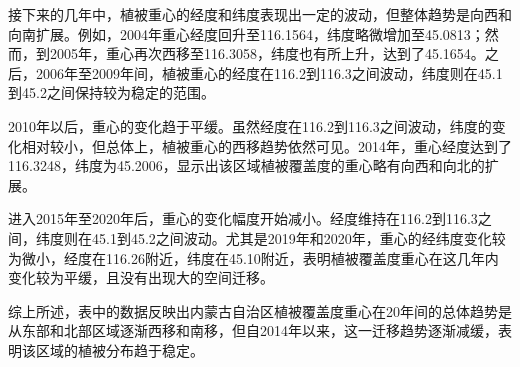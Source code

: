 \documentclass[AutoFakeBold]{LZUThesis-PgD&PhD}
\begin{document}
		接下来的几年中，植被重心的经度和纬度表现出一定的波动，但整体趋势是向西和向南扩展。例如，2004年重心经度回升至116.1564，纬度略微增加至45.0813；然而，到2005年，重心再次西移至116.3058，纬度也有所上升，达到了45.1654。之后，2006年至2009年间，植被重心的经度在116.2到116.3之间波动，纬度则在45.1到45.2之间保持较为稳定的范围。
		
		2010年以后，重心的变化趋于平缓。虽然经度在116.2到116.3之间波动，纬度的变化相对较小，但总体上，植被重心的西移趋势依然可见。2014年，重心经度达到了116.3248，纬度为45.2006，显示出该区域植被覆盖度的重心略有向西和向北的扩展。
		
		进入2015年至2020年后，重心的变化幅度开始减小。经度维持在116.2到116.3之间，纬度则在45.1到45.2之间波动。尤其是2019年和2020年，重心的经纬度变化较为微小，经度在116.26附近，纬度在45.10附近，表明植被覆盖度重心在这几年内变化较为平缓，且没有出现大的空间迁移。
		
		综上所述，表中的数据反映出内蒙古自治区植被覆盖度重心在20年间的总体趋势是从东部和北部区域逐渐西移和南移，但自2014年以来，这一迁移趋势逐渐减缓，表明该区域的植被分布趋于稳定。
		
		
		
\end{document}
